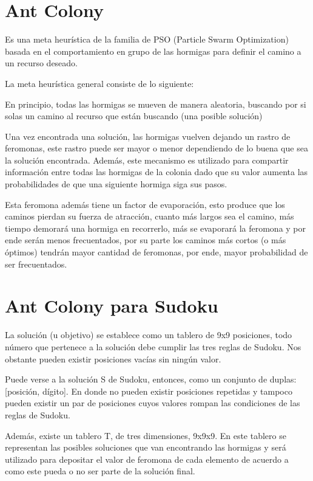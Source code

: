 \documentclass[a4paper,spanish]{article}
\begin{document}
\clearpage


\section{Ant Colony}

Es una meta heurística de la familia de PSO (Particle Swarm Optimization) basada en el comportamiento en grupo 
de las hormigas para definir el camino a un recurso deseado.

La meta heurística general consiste de lo siguiente:

En principio, todas las hormigas se mueven de manera aleatoria, buscando por si solas un camino 
al recurso que están buscando (una posible solución)

Una vez encontrada una solución, las hormigas vuelven dejando un rastro de feromonas, 
este rastro puede ser mayor o menor dependiendo de lo buena que sea la solución encontrada.
Además, este mecanismo es utilizado para compartir información entre todas las hormigas de la colonia 
dado que su valor aumenta las probabilidades de que una siguiente hormiga siga sus pasos.

Esta feromona además tiene un factor de evaporación, esto produce que los caminos pierdan su 
fuerza de atracción, cuanto más largos sea el camino, más tiempo demorará una hormiga en recorrerlo, 
más se evaporará la feromona y por ende serán menos frecuentados, por su parte los caminos más cortos 
(o más óptimos) tendrán mayor cantidad de feromonas, por ende, mayor probabilidad de ser frecuentados.

\section{Ant Colony para Sudoku}

La solución (u objetivo) se establece como un tablero de 9x9 posiciones, todo número que pertenece a la 
solución debe cumplir las tres reglas de Sudoku. Nos obstante pueden existir posiciones vacías sin ningún valor.

Puede verse a la solución S de Sudoku, entonces, como un conjunto de duplas: [posición, dígito]. En donde no pueden
existir posiciones repetidas y tampoco pueden existir un par de posiciones cuyos valores rompan las condiciones de 
las reglas de Sudoku.

Además, existe un tablero T, de tres dimensiones, 9x9x9. En este tablero se representan las posibles soluciones
que van encontrando las hormigas y será utilizado para depositar el valor de feromona de cada elemento de acuerdo
a como este pueda o no ser parte de la solución final.
\end{document}
